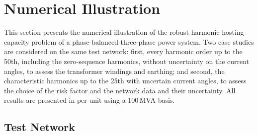 \section{Numerical Illustration}
\label{sec:numerical_illustration}

This section presents the numerical illustration of the robust harmonic hosting capacity problem of a phase-balanced three-phase power system. Two case studies are considered on the same test network: first, every harmonic order up to the 50th, including the zero-sequence harmonics, without uncertainty on the current angles, to assess the transformer windings and earthing; and second, the characteristic harmonics up to the 25th with uncertain current angles, to assess the choice of the risk factor and the network data and their uncertainty. All results are presented in per-unit using a 100\,MVA basis.


\subsection{Test Network}
\label{sec:test_network}

